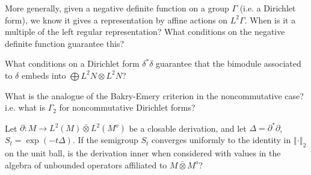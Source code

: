 \documentclass[12pt,letterpaper, reqno]{amsart}
\begin{document}
\begin{problem}
 More generally, given a negative definite
function on a group $\Gamma$ (i.e. a Dirichlet form), we know it
gives a representation by affine actions on $L^{2}\Gamma$. When
is it a multiple of the left regular representation? What conditions
on the negative definite function guarantee this?\end{problem}
\begin{problem}
 What conditions on a Dirichlet form $\delta^{*}\delta$
guarantee that the bimodule associated to $\delta$ embeds into $\bigoplus L^{2}N\otimes L^{2}N$? \end{problem}
\begin{problem}
What is the analogue of the Bakry-Emery criterion
in the noncommutative case? i.e. what is $\Gamma_{2}$ for noncommutative
Dirichlet forms?\end{problem}

\begin{problem}

 Let $\partial:M\to L^{2}(M)\bar{\otimes}L^{2}(M^{o})$
be a closable derivation, and let $\Delta=\partial^{*}\partial$,
$S_{t}=\exp(-t\Delta)$. If the semigroup $S_{t}$   
  converges uniformly to the identity in $\left\Vert \cdot\right\Vert _{2}$
on the unit ball, is the derivation inner when considered with values
in the algebra of unbounded operators affiliated to $M\bar{\otimes}M^{o}$?
\end{problem}
\end{document}
